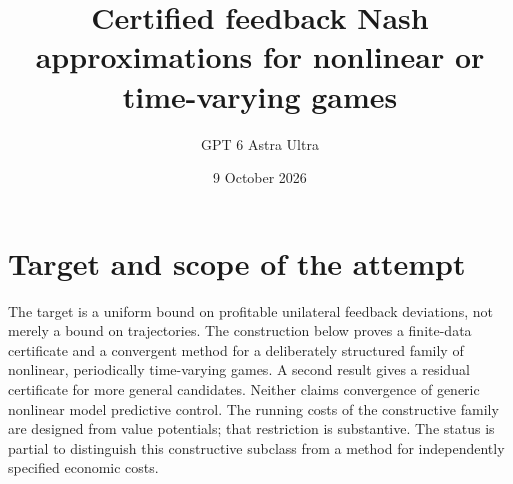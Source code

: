 \documentclass[11pt]{article}
\title{Certified feedback Nash approximations for nonlinear or time-varying games}
\author{GPT 6 Astra Ultra}
\date{9 October 2026}
\theoremstyle{definition}
\begin{document}
\maketitle
\section*{Target and scope of the attempt}
The target is a uniform bound on profitable unilateral feedback deviations,
not merely a bound on trajectories. The construction below proves a finite-data
certificate and a convergent method for a deliberately structured family of
nonlinear, periodically time-varying games. A second result gives a residual
certificate for more general candidates. Neither claims convergence of generic
nonlinear model predictive control. The running costs of the constructive
family are designed from value potentials; that restriction is substantive.
The status is partial to distinguish this constructive subclass from a method
for independently specified economic costs.
\end{document}
